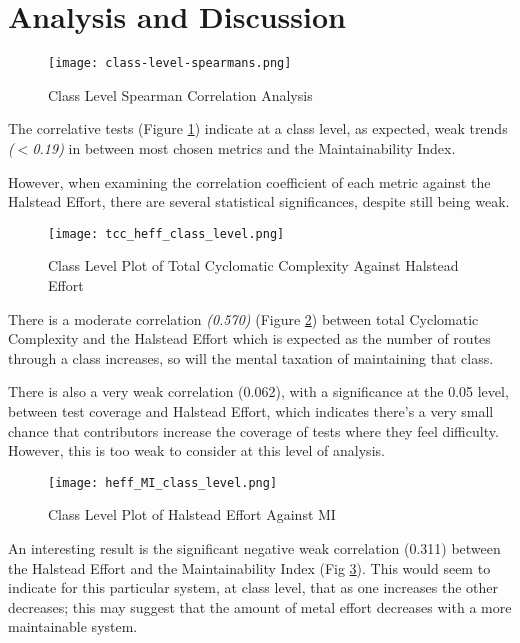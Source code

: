 \section{Analysis and Discussion}

\begin{figure}[H]
	\texttt{[image: class-level-spearmans.png]}
	\caption{Class Level Spearman Correlation Analysis}
	\label{fig:classLevelSpearmans}  
\end{figure}

The correlative tests (Figure \ref{fig:classLevelSpearmans}) indicate at a class level, as expected, weak trends \textit{($<$0.19)} in between most chosen metrics and the Maintainability Index. 

However, when examining the correlation coefficient of each metric against the Halstead Effort, there are several statistical significances, despite still being weak. 

\begin{figure}[H]
	\texttt{[image: tcc\_heff\_class\_level.png]}
	\caption{Class Level Plot of Total Cyclomatic Complexity Against Halstead Effort}
	\label{fig:tccHeffClassLevel}  
\end{figure}

There is a moderate correlation \textit{(0.570)} (Figure \ref{fig:tccHeffClassLevel}) between total Cyclomatic Complexity and the Halstead Effort which is expected as the number of routes through a class increases, so will the mental taxation of maintaining that class. 

There is also a very weak correlation (0.062), with a significance at the 0.05 level, between test coverage and Halstead Effort, which indicates there's a very small chance that contributors increase the coverage of tests where they feel difficulty. However, this is too weak to consider at this level of analysis.

\begin{figure}[H]
	\texttt{[image: heff\_MI\_class\_level.png]}
	\caption{Class Level Plot of Halstead Effort Against MI}
	\label{fig:heffMIClassLevel}  
\end{figure}

An interesting result is the significant negative weak correlation (0.311) between the Halstead Effort and the Maintainability Index (Fig \ref{fig:heffMIClassLevel}). This would seem to indicate for this particular system, at class level, that as one increases the other decreases; this may suggest that the amount of metal effort decreases with a more maintainable system.

